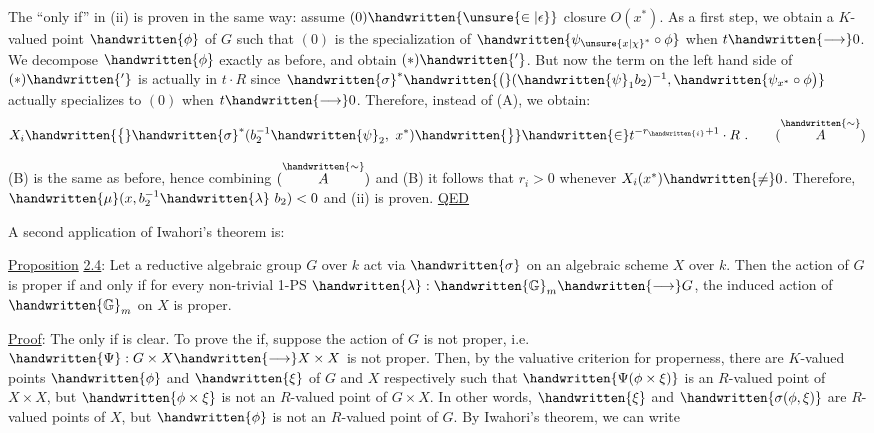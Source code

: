 The ``only if'' in (ii) is proven in the same way: assume $(0)\handwritten{\unsure{\in|\epsilon}}$ closure $O(x^*)$. As a first step, we obtain a $K$-valued point $\handwritten{\phi}$ of $G$ such that $(0)$ is the specialization of $\handwritten{\psi_{\unsure{x|\chi}^*}\circ\phi}$ when $t\handwritten{\longrightarrow}0$. We decompose $\handwritten{\phi}$ exactly as before, and obtain $(*)\handwritten{'}$. But now the term on the left hand side of $(*)\handwritten{'}$ is actually in $t\cdot R$ since $\handwritten{\sigma}^{*}\handwritten{\bigl(}(\handwritten{\psi}_1 b_2)^{-1},\handwritten{\psi_{x^*}\circ\phi\bigr)}$ actually specializes to $(0)$ when $t\handwritten{\longrightarrow}0$. Therefore, instead of (A), we obtain:
\[
X_i\handwritten{\bigl\{}\handwritten{\sigma}^{*}(b_2^{-1}\handwritten{\psi}_2,\ x^*)\handwritten{\bigr\}}\handwritten{\in}t^{-r_{\handwritten{i}}+1}\cdot R\ .
\tag*{($\overset{\handwritten{\sim}}{A}$)}
\]

(B) is the same as before, hence combining $(\overset{\handwritten{\sim}}{A})$ and (B) it follows that $r_i>0$ whenever $X_i(x^*)\handwritten{\neq}0$. Therefore, $\handwritten{\mu}(x,b_2^{-1}\handwritten{\lambda}\ b_2)<0$ and (ii) is proven. \uline{QED}

A second application of Iwahori's theorem is:

\uline{Proposition} \uline{2.4}: Let a reductive algebraic group $G$ over $k$ act via $\handwritten{\sigma}$ on an algebraic scheme $X$ over $k$. Then the action of $G$ is proper if and only if for every non-trivial 1-PS $\handwritten{\lambda}:\handwritten{\mathbb{G}}_m\handwritten{\longrightarrow}G$, the induced action of $\handwritten{\mathbb{G}}_m$ on $X$ is proper.

\uline{Proof}: The only if is clear. To prove the if, suppose the action of $G$ is not proper, i.e. $\handwritten{\Psi}:G\times X\handwritten{\longrightarrow}X\times X$ is not proper. Then, by the valuative criterion for properness, there are $K$-valued points $\handwritten{\phi}$ and $\handwritten{\xi}$ of $G$ and $X$ respectively such that $\handwritten{\Psi(\phi\times\xi)}$ is an $R$-valued point of $X\times X$, but $\handwritten{\phi\times\xi}$ is not an $R$-valued point of $G\times X$. In other words, $\handwritten{\xi}$ and $\handwritten{\sigma(\phi,\xi)}$ are $R$-valued points of $X$, but $\handwritten{\phi}$ is not an $R$-valued point of $G$. By Iwahori's theorem, we can write
